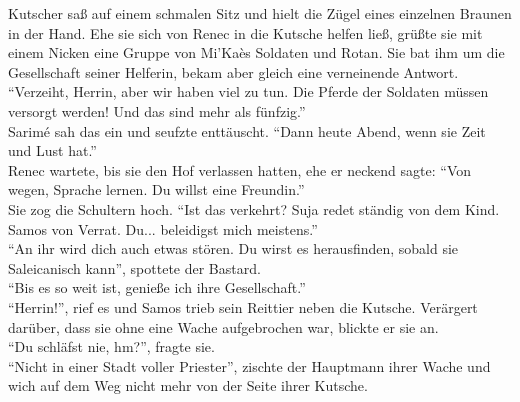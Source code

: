Kutscher saß auf einem schmalen Sitz und hielt die Zügel eines einzelnen Braunen in der Hand. Ehe 
sie sich von Renec in die Kutsche helfen ließ, grüßte sie mit einem Nicken eine Gruppe von Mi'Kaès 
Soldaten und Rotan. Sie bat ihm um die Gesellschaft seiner Helferin, bekam aber gleich eine 
verneinende Antwort. ``Verzeiht, Herrin, aber wir haben viel zu tun. Die Pferde der Soldaten müssen 
versorgt werden! Und das sind mehr als fünfzig.''\\
Sarimé sah das ein und seufzte enttäuscht. ``Dann heute Abend, wenn sie Zeit und Lust hat.''\\
Renec wartete, bis sie den Hof verlassen hatten, ehe er neckend sagte: ``Von wegen, Sprache lernen. 
Du willst eine Freundin.''\\
Sie zog die Schultern hoch. ``Ist das verkehrt? Suja redet ständig von dem Kind. Samos von Verrat. 
Du... beleidigst mich meistens.''\\
``An ihr wird dich auch etwas stören. Du wirst es herausfinden, sobald sie Saleicanisch kann'', 
spottete der Bastard.\\
``Bis es so weit ist, genieße ich ihre Gesellschaft.''\\
``Herrin!'', rief es und Samos trieb sein Reittier neben die Kutsche. Verärgert darüber, dass sie 
ohne eine Wache aufgebrochen war, blickte er sie an.\\
``Du schläfst nie, hm?'', fragte sie.\\
``Nicht in einer Stadt voller Priester'', zischte der Hauptmann ihrer Wache und wich auf dem Weg 
nicht mehr von der Seite ihrer Kutsche.\\

